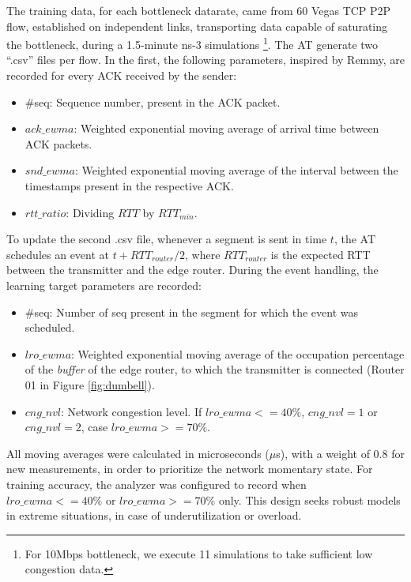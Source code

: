 \documentclass[a4paper,fleqn]{cas-sc}
\begin{document}
The training data, for each bottleneck datarate, came from  60 Vegas TCP P2P flow, established on independent links, transporting data capable of saturating the bottleneck, during a 1.5-minute ns-3 simulations \footnote{For 10Mbps bottleneck, we execute 11 simulations  to take sufficient low congestion data.}. The AT generate two ``.csv'' files per flow. In the first, the following parameters, inspired by Remmy, are recorded for every ACK received by the sender:  
\begin{itemize}
	\item \#seq: Sequence number, present in the ACK packet.
	\item $ack\_ewma$: Weighted exponential moving average of arrival time between ACK packets. 
	\item $snd\_ewma$: Weighted exponential moving average of the interval between the timestamps present in the respective ACK. 
	\item $rtt\_ratio$: Dividing $RTT$ by $RTT_{min}$.
\end{itemize}

To update the second .csv file, whenever a segment is sent in time $t$, the AT schedules an event at $t+RTT_{router}/2$, where $RTT_{router}$ is the expected RTT between the transmitter and the edge router. During the event handling, the learning target parameters are recorded: 
\begin{itemize}
	\item \#seq: Number of seq present in the segment for which the event was scheduled.
	\item $lro\_ewma$: Weighted exponential moving average of the occupation percentage of the \textit{buffer} of the edge router, to which the transmitter is connected (Router 01 in Figure \ref{fig:dumbell}).
	\item $cng\_nvl$: Network congestion level. If $lro\_ewma <= 40\%$, $cng\_nvl=1$ or $cng\_nvl=2$, case $lro\_ewma>=70\%$.
\end{itemize}

All moving averages were calculated in microseconds ($\mu$s), with a weight of 0.8 for new measurements, in order to prioritize the network momentary state. For training accuracy, the analyzer was configured to record when $lro\_ewma <= 40\%$ or $lro\_ewma>=70\%$ only. This design seeks robust models in extreme situations, in case of underutilization or overload.
\end{document}
